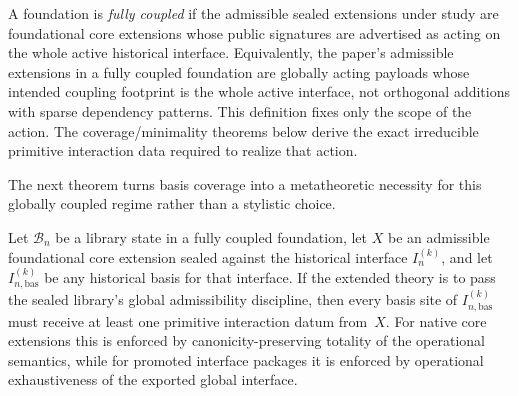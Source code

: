 \documentclass{lmcs}
\newcommand{\B}{\mathcal{B}}
\begin{document}
\begin{defi}
\label{def:fully-coupled}
A foundation is \emph{fully coupled} if the admissible sealed extensions under study are foundational core extensions whose public signatures are advertised as acting on the whole active historical interface. Equivalently, the paper's admissible extensions in a fully coupled foundation are globally acting payloads whose intended coupling footprint is the whole active interface, not orthogonal additions with sparse dependency patterns. This definition fixes only the scope of the action. The coverage/minimality theorems below derive the exact irreducible primitive interaction data required to realize that action.
\end{defi}

The next theorem turns basis coverage into a metatheoretic necessity for this globally coupled regime rather than a stylistic choice.

\begin{thm}
\label{thm:coverage}
Let $\B_n$ be a library state in a fully coupled foundation, let $X$ be an
admissible foundational core extension sealed against the historical interface
$I_n^{(k)}$, and let $I_{n,\mathrm{bas}}^{(k)}$ be any historical basis for
that interface. If the extended theory is to pass the sealed library's global
admissibility discipline, then every basis site of
$I_{n,\mathrm{bas}}^{(k)}$ must receive at least one primitive interaction
datum from~$X$. For native core extensions this is enforced by
canonicity-preserving totality of the operational semantics, while for promoted
interface packages it is enforced by operational exhaustiveness of the exported
global interface.
\end{thm}
\end{document}
